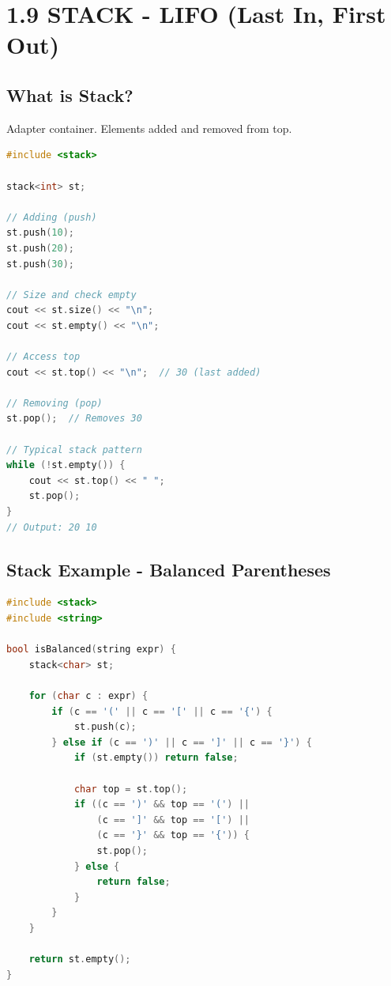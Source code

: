 \hypertarget{stack---lifo-last-in-first-out}{%
\section{1.9 STACK - LIFO (Last In, First
Out)}\label{stack---lifo-last-in-first-out}}

\hypertarget{what-is-stack}{%
\subsection{What is Stack?}\label{what-is-stack}}

Adapter container. Elements added and removed from top.

\begin{lstlisting}[language={C++}]
#include <stack>

stack<int> st;

// Adding (push)
st.push(10);
st.push(20);
st.push(30);

// Size and check empty
cout << st.size() << "\n";
cout << st.empty() << "\n";

// Access top
cout << st.top() << "\n";  // 30 (last added)

// Removing (pop)
st.pop();  // Removes 30

// Typical stack pattern
while (!st.empty()) {
    cout << st.top() << " ";
    st.pop();
}
// Output: 20 10
\end{lstlisting}

\hypertarget{stack-example---balanced-parentheses}{%
\subsection{Stack Example - Balanced
Parentheses}\label{stack-example---balanced-parentheses}}

\begin{lstlisting}[language={C++}]
#include <stack>
#include <string>

bool isBalanced(string expr) {
    stack<char> st;
    
    for (char c : expr) {
        if (c == '(' || c == '[' || c == '{') {
            st.push(c);
        } else if (c == ')' || c == ']' || c == '}') {
            if (st.empty()) return false;
            
            char top = st.top();
            if ((c == ')' && top == '(') ||
                (c == ']' && top == '[') ||
                (c == '}' && top == '{')) {
                st.pop();
            } else {
                return false;
            }
        }
    }
    
    return st.empty();
}
\end{lstlisting}

